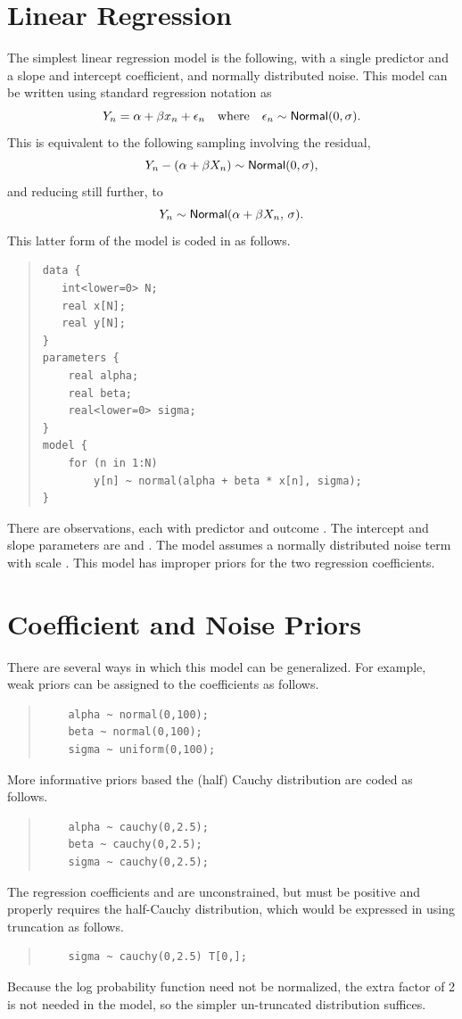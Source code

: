 \section{Linear Regression}

The simplest linear regression model is the following, with a single
predictor and a slope and intercept coefficient, and normally
distributed noise.  This model can be written using standard
regression notation as
%
\[
Y_n = \alpha + \beta x_n + \epsilon_n
\ \ \ \mbox{where} \ \ \ 
\epsilon_n \sim \distro{Normal}(0,\sigma).
\]
This is equivalent to the following sampling involving the
residual,
\[
Y_n - (\alpha + \beta X_n) \sim \mbox{\sf Normal}(0,\sigma),
\]
and reducing still further, to
\[
Y_n \sim \mbox{\sf Normal}(\alpha + \beta X_n, \, \sigma).
\]
%
This latter form of the model is coded in \Stan as follows.
%
\begin{quote}
\begin{Verbatim}
data {
   int<lower=0> N;
   real x[N];
   real y[N];
}
parameters {
    real alpha;
    real beta;
    real<lower=0> sigma;
}
model {
    for (n in 1:N)
        y[n] ~ normal(alpha + beta * x[n], sigma);
}
\end{Verbatim}
\end{quote}
%
There are  observations, each with predictor  and
outcome \code{y[n]}.  The intercept and slope parameters are
 and .  The model assumes a normally
distributed noise term with scale .  This model has
improper priors for the two regression coefficients.

\section{Coefficient and Noise Priors}

There are several ways in which this model can be generalized.  
For example, weak priors can be assigned to the coefficients as follows.
%
\begin{quote}
\begin{Verbatim}
    alpha ~ normal(0,100);
    beta ~ normal(0,100);
    sigma ~ uniform(0,100);
\end{Verbatim}
\end{quote}
%
More informative priors based the (half) Cauchy distribution are coded
as follows.
%
\begin{quote}
\begin{Verbatim}
    alpha ~ cauchy(0,2.5);
    beta ~ cauchy(0,2.5);
    sigma ~ cauchy(0,2.5);
\end{Verbatim}
\end{quote}
%
The regression coefficients  and  are
unconstrained, but  must be positive and properly
requires the half-Cauchy distribution, which would be expressed in
\Stan using truncation as follows.
%
\begin{quote}
\begin{Verbatim}
    sigma ~ cauchy(0,2.5) T[0,];
\end{Verbatim}
\end{quote}
%
Because the log probability function need not be normalized, the extra
factor of 2 is not needed in the model, so the simpler un-truncated
distribution suffices.

